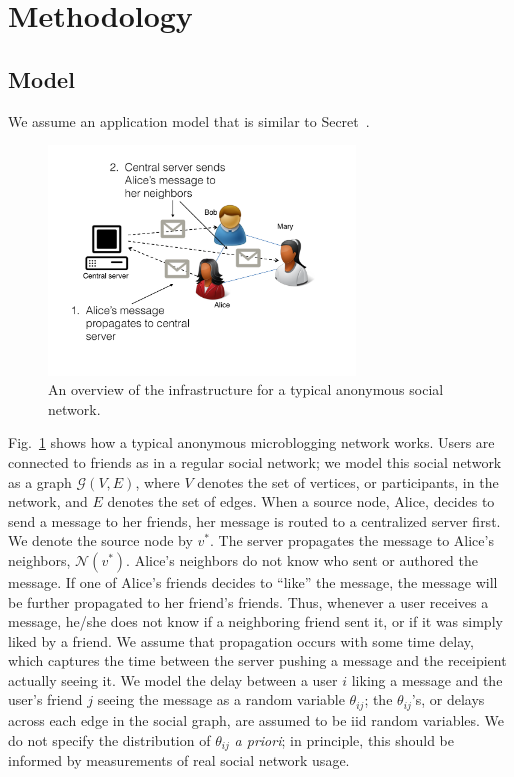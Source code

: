 \section{Methodology}

\subsection{Model}

We assume an application model that is similar to Secret~\cite{secret}.
\begin{figure}
\centering
\includegraphics[height = 2.4in]{figures/secret_infrastructure}
\caption{An overview of the infrastructure for a typical anonymous social network.}
\label{fig:secret_infrastructure}
\end{figure}
Fig.~\ref{fig:secret_infrastructure} shows how a typical anonymous microblogging network works. Users are connected to friends as in a regular social network; we model this social network as a graph $\mathcal G(V,E)$, where $V$ denotes the set of vertices, or participants, in the network, and $E$ denotes the set of edges. When a source node, Alice, decides to send a message to her friends, her message is routed to a centralized server first. We denote the source node by $v^*$. The server propagates the message to Alice's neighbors, $\mathcal N(v^*)$. Alice's neighbors do not know who sent or authored the message. %
If one of Alice's friends decides to ``like'' the message, the message will be further propagated to her friend's friends. Thus, whenever a user receives a message, he/she does not know if a neighboring friend sent it, or if it was simply liked by a friend. We assume that propagation occurs with some time delay, which captures the time between the server pushing a message and the receipient actually seeing it. We model the delay between a user $i$ liking a message and the user's friend $j$ seeing the message as a random variable $\theta_{ij}$; the $\theta_{ij}$'s, or delays across each edge in the social graph, are assumed to be iid random variables. We do not specify the distribution of $\theta_{ij}$ \emph{a priori}; in principle, this should be informed by measurements of real social network usage.


